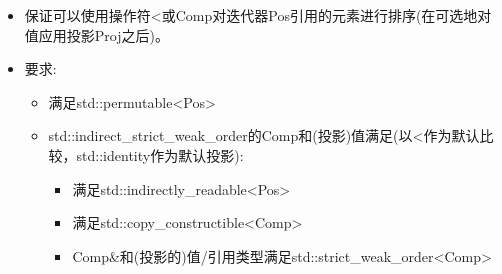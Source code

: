 \begin{itemize}
\item
保证可以使用操作符<或Comp对迭代器Pos引用的元素进行排序(在可选地对值应用投影Proj之后)。

\item
要求:
\begin{itemize}
\item
满足std::permutable<Pos>

\item
std::indirect\_strict\_weak\_order的Comp和(投影)值满足(以<作为默认比较，std::identity作为默认投影):

\begin{itemize}
\item
满足std::indirectly\_readable<Pos>

\item
满足std::copy\_constructible<Comp>

\item
Comp\&和(投影的)值/引用类型满足std::strict\_weak\_order<Comp>
\end{itemize}
\end{itemize}
\end{itemize}

























